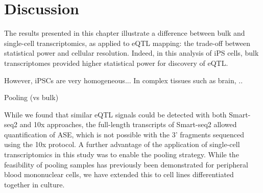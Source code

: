 

\section{Discussion}


The results presented in this chapter illustrate a difference between bulk and single-cell transcriptomics, as applied to eQTL mapping: the trade-off between statistical power and cellular resolution. 
Indeed, in this analysis of iPS cells, bulk transcriptomes provided higher statistical power for discovery of eQTL. 

However, iPSCs are very homogeneous...
In complex tissues such as brain, ..

Pooling (vs bulk)


While we found that similar eQTL signals could be detected with both Smart-seq2 and 10x approaches, the full-length transcripts of Smart-seq2 allowed quantification of ASE, which is not possible with the 3' fragments sequenced using the 10x protocol.
A further advantage of the application of single-cell transcriptomics in this study was to enable the pooling strategy. 
While the feasibility of pooling samples has previously been demonstrated for peripheral blood mononuclear cells\cite{kang2018multiplexed}, we have extended this to cell lines differentiated together in culture. \\








